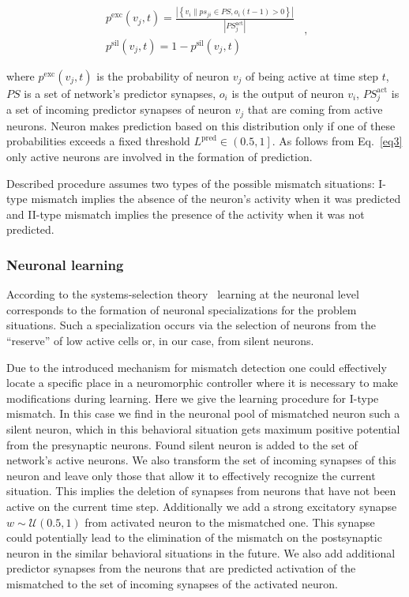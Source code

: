 \documentclass[letterpaper]{article}
\begin{document}
\begin{equation}
	\label{eq3}
	\begin{array}{c}
		p^{\mathrm{exc}}\left(v_{j}, t\right) = \frac{\left\vert\left\{v_{i} \| ps_{ji} \in PS, o_{i}\left(t-1\right)>0\right\}\right\vert}
			{\left\vert PS_{j}^{\mathrm{act}}\right\vert} \\
		p^{\mathrm{sil}}\left(v_{j}, t\right) = 1 - p^{\mathrm{sil}}\left(v_{j}, t\right)
	\end{array}
	\enspace , 
\end{equation}      

\noindent where $p^{\mathrm{exc}}\left(v_{j}, t\right)$ is the probability of neuron $v_{j}$ of being active at time step $t$, $PS$ is a set of network's predictor synapses, $o_{i}$ is the output of neuron $v_{i}$, $PS_{j}^{\mathrm{act}}$ is a set of incoming predictor synapses of neuron $v_{j}$ that are coming from active neurons. Neuron makes prediction based on this distribution only if one of these probabilities exceeds a fixed threshold $L^{\mathrm{pred}}\in\left(0.5,1\right]$. As follows from Eq.~\ref{eq3} only active neurons are involved in the formation of prediction. 

Described procedure assumes two types of the possible mismatch situations: I-type mismatch implies the absence of the neuron's activity when it was predicted and II-type mismatch implies the presence of the activity when it was not predicted. 

\subsubsection{Neuronal learning} According to the systems-selection theory~\citep{Shvyrkov1986} learning at the neuronal level corresponds to the formation of neuronal specializations for the problem situations. Such a specialization occurs via the selection of neurons from the ``reserve'' of low active cells or, in our case, from silent neurons.

Due to the introduced mechanism for mismatch detection one could effectively locate a specific place in a neuromorphic controller where it is necessary to make modifications during learning. Here we give the learning procedure for I-type mismatch. In this case we find in the neuronal pool of mismatched neuron such a silent neuron, which in this behavioral situation gets maximum positive potential from the presynaptic neurons. Found silent neuron is added to the set of network's active neurons. We also transform the set of incoming synapses of this neuron and leave only those that allow it to effectively recognize the current situation. This implies the deletion of synapses from neurons that have not been active on the current time step. Additionally we add a strong excitatory synapse $w\sim \mathcal{U}\left(0.5,1\right)$ from activated neuron to the mismatched one. This synapse could potentially lead to the elimination of the mismatch on the postsynaptic neuron in the similar behavioral situations in the future. We also add additional predictor synapses from the neurons that are predicted activation of the mismatched to the set of incoming synapses of the activated neuron. 
\end{document}
